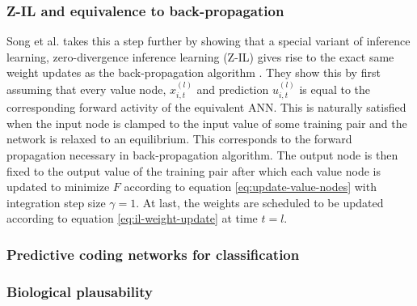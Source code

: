 \documentclass[a4paper,11pt]{article} %
\begin{document}
\subsubsection{Z-IL and equivalence to back-propagation}
Song et al. takes this a step further by showing that a special variant of inference learning, zero-divergence inference learning (Z-IL) gives rise to the exact same weight updates as the back-propagation algorithm \cite{PredictiveCodingNetworks}. They show this by first assuming that every value node, $x_{i,t}^{(l)}$ and prediction $u_{i,t}^{(l)}$ is equal to the corresponding forward activity of the equivalent ANN. This is naturally satisfied when the input node is clamped to the input value of some training pair and the network is relaxed to an equilibrium. This corresponds to the forward propagation necessary in back-propagation algorithm. The output node is then fixed to the output value of the training pair after which each value node is updated to minimize $F$ according to equation \ref{eq:update-value-nodes} with integration step size $\gamma = 1$. At last, the weights are scheduled to be updated according to equation \ref{eq:il-weight-update} at time $t=l$.

\subsubsection{Predictive coding networks for classification}





\subsubsection{Biological plausability}
\end{document}
